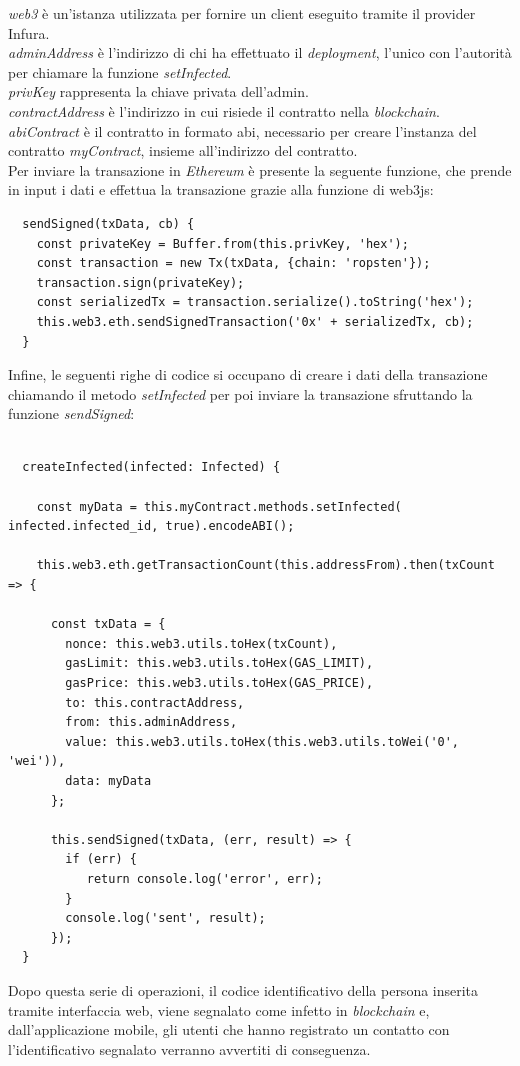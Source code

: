 \textit{web3} è un'istanza utilizzata per fornire un client eseguito tramite il provider Infura.\\
\textit{adminAddress} è l'indirizzo di chi ha effettuato il \textit{deployment}, l'unico con l'autorità per chiamare la funzione \textit{setInfected}.\\
\textit{privKey} rappresenta la chiave privata dell'admin.\\
\textit{contractAddress} è l'indirizzo in cui risiede il contratto nella \textit{blockchain}.\\
\textit{abiContract} è il contratto in formato abi, necessario per creare l'instanza del contratto \textit{myContract}, insieme all'indirizzo del contratto.\\

Per inviare la transazione in \textit{Ethereum} è presente la seguente funzione, che prende in input i dati e effettua la transazione grazie alla funzione di web3js:

\begin{lstlisting}
  sendSigned(txData, cb) {
    const privateKey = Buffer.from(this.privKey, 'hex');
    const transaction = new Tx(txData, {chain: 'ropsten'});
    transaction.sign(privateKey);
    const serializedTx = transaction.serialize().toString('hex');
    this.web3.eth.sendSignedTransaction('0x' + serializedTx, cb);
  }
\end{lstlisting}

Infine, le seguenti righe di codice si occupano di creare i dati della transazione chiamando il metodo \textit{setInfected} per poi inviare la transazione sfruttando la funzione \textit{sendSigned}:
\begin{lstlisting}

  createInfected(infected: Infected) {

    const myData = this.myContract.methods.setInfected( infected.infected_id, true).encodeABI();

    this.web3.eth.getTransactionCount(this.addressFrom).then(txCount => {

      const txData = {
        nonce: this.web3.utils.toHex(txCount),
        gasLimit: this.web3.utils.toHex(GAS_LIMIT),
        gasPrice: this.web3.utils.toHex(GAS_PRICE),
        to: this.contractAddress,
        from: this.adminAddress,
        value: this.web3.utils.toHex(this.web3.utils.toWei('0', 'wei')),
        data: myData
      };

      this.sendSigned(txData, (err, result) => {
        if (err) {
           return console.log('error', err);
        }
        console.log('sent', result);
      });
  }
\end{lstlisting}

Dopo questa serie di operazioni, il codice identificativo della persona inserita tramite interfaccia web, viene segnalato come infetto in \textit{blockchain} e, dall'applicazione mobile, gli utenti che hanno registrato un contatto con l'identificativo segnalato verranno avvertiti di conseguenza.


